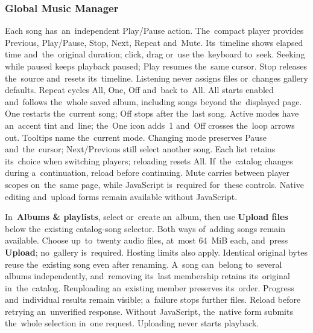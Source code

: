 \documentclass[11pt,a4paper]{article}
\newcommand{\ui}[1]{\textbf{#1}}
\begin{document}
\subsubsection{Global Music Manager}

Each song has~an~independent Play/Pause action. The~compact player provides
Previous, Play/Pause, Stop, Next, Repeat and~Mute. Its~timeline shows
elapsed time and~the~original duration; click, drag or~use the~keyboard to~seek.
Seeking while paused keeps playback paused; Play resumes the~same cursor.
Stop releases the~source and~resets its~timeline. Listening never assigns files
or~changes gallery defaults. Repeat cycles All, One, Off and~back to~All.
All starts enabled and~follows the~whole saved album, including songs beyond
the~displayed page. One restarts the~current song; Off stops after the~last song.
Active modes have an~accent tint and~line; the~One icon adds~1 and~Off crosses
the~loop arrows out. Tooltips name the~current mode. Changing mode preserves
Pause and~the~cursor; Next/Previous still select another song. Each list retains
its~choice when switching players; reloading resets All. If~the~catalog changes
during a~continuation, reload
before continuing. Mute carries between player scopes on~the~same page, while
JavaScript is~required for~these controls. Native editing and~upload forms
remain available without JavaScript.

In~\ui{Albums \& playlists}, select or~create an~album, then use
\ui{Upload files} below the~existing catalog-song selector. Both ways of~adding
songs remain available. Choose up~to~twenty audio files, at~most 64~MiB each,
and~press \ui{Upload}; no~gallery is~required. Hosting limits also apply.
Identical original bytes reuse the~existing song even after renaming. A~song
can~belong to~several albums independently, and~removing its~last membership
retains its~original in~the~catalog. Reuploading an~existing member preserves
its~order. Progress and~individual results remain visible; a~failure stops
further files. Reload before retrying an~unverified response. Without
JavaScript, the~native form submits the~whole selection in~one request.
Uploading never starts playback.
\end{document}
